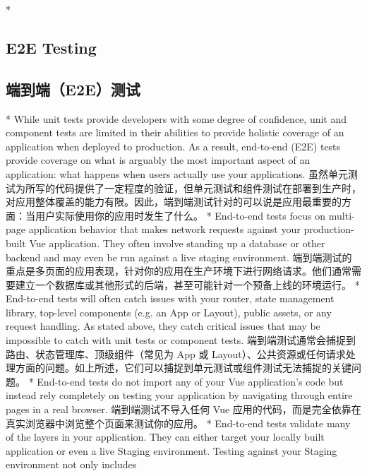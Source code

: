 \begin{paracol}{2}
 
\switchcolumn[0]*%
\subsection{E2E Testing}
\switchcolumn
\subsection{端到端（E2E）测试}
\switchcolumn[0]*%
While unit tests provide developers with some degree of confidence, unit
and component tests are limited in their abilities to provide holistic
coverage of an application when deployed to production. As a result,
end-to-end (E2E) tests provide coverage on what is arguably the most
important aspect of an application: what happens when users actually use
your applications.
\switchcolumn
虽然单元测试为所写的代码提供了一定程度的验证，但单元测试和组件测试在部署到生产时，对应用整体覆盖的能力有限。因此，端到端测试针对的可以说是应用最重要的方面：当用户实际使用你的应用时发生了什么。
\switchcolumn[0]*%
End-to-end tests focus on multi-page application behavior that makes
network requests against your production-built Vue application. They
often involve standing up a database or other backend and may even be
run against a live staging environment.
\switchcolumn
端到端测试的重点是多页面的应用表现，针对你的应用在生产环境下进行网络请求。他们通常需要建立一个数据库或其他形式的后端，甚至可能针对一个预备上线的环境运行。
\switchcolumn[0]*%
End-to-end tests will often catch issues with your router, state
management library, top-level components (e.g. an App or Layout), public
assets, or any request handling. As stated above, they catch critical
issues that may be impossible to catch with unit tests or component
tests.
\switchcolumn
端到端测试通常会捕捉到路由、状态管理库、顶级组件（常见为 App 或
Layout）、公共资源或任何请求处理方面的问题。如上所述，它们可以捕捉到单元测试或组件测试无法捕捉的关键问题。
\switchcolumn[0]*%
End-to-end tests do not import any of your Vue application's code but
instead rely completely on testing your application by navigating
through entire pages in a real browser.
\switchcolumn
端到端测试不导入任何 Vue
应用的代码，而是完全依靠在真实浏览器中浏览整个页面来测试你的应用。
\switchcolumn[0]*%
End-to-end tests validate many of the layers in your application. They
can either target your locally built application or even a live Staging
environment. Testing against your Staging environment not only includes

\end{paracol}
